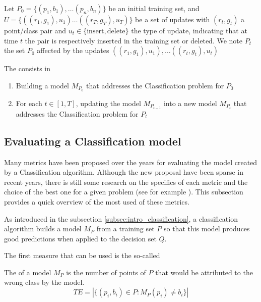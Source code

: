 \begin{definition}
Let $P_0 = \{(p_1, b_1), \dots (p_n, b_n)\}$ be an initial training set, and $U = \{((r_1, g_1), u_1) \dots ((r_T, g_T), u_T)\}$ be a set of updates with $(r_t, g_t)$ a point/class pair and $u_t \in \{\text{insert}, \text{delete}\}$ the type of update, indicating that at time $t$ the pair is respectively inserted in the training set or deleted. We note $P_t$ the set $P_0$ affected by the updates $((r_1, g_1), u_1), \dots ((r_t, g_t), u_t)$

The  consists in
\begin{enumerate}
    \item Building a model $M_{P_0}$ that addresses the Classification problem for $P_0$
    \item For each $t \in [1, T]$, updating the model $M_{P_{t-1}}$ into a new model $M_{P_t}$ that addresses the Classification problem for $P_t$
\end{enumerate}
\end{definition}

\subsection{Evaluating a Classification model}\label{subsec:intro_class_metrics}
Many metrics have been proposed over the years for evaluating the model created by a Classification algorithm. Although the new proposal have been sparse in recent years, there is still some research on the specifics of each metric and the choice of the best one for a given problem (see for example \cite{Canbek2017_Class_metrics_terminology}). This subsection provides a quick overview of the most used of these metrics.

As introduced in the subsection \ref{subsec:intro_classification}, a classification algorithm builds a model $M_P$ from a training set $P$ so that this model produces good predictions when applied to the decision set $Q$.

The first measure that can be used is the so-called 
\begin{definition}
    The  of a model $M_P$ is the number of points of $P$ that would be attributed to the wrong class by the model.
    \begin{equation}
        TE = |\{(p_i, b_i)\in P: M_P(p_i) \neq b_i\}|
    \end{equation}
\end{definition}

